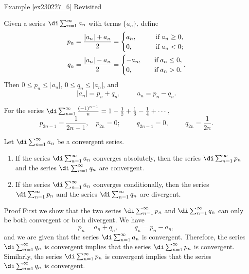 \begin{example}{\linkt Example \ref{ex230227_6} Revisited}
\begin{example}[label=ex230227_13]{}
Given a series $\di\sum_{n=1}^{\infty}a_n$ with terms $\{a_n\}$, define 
\begin{align*}
p_n&=\frac{|a_n|+a_n}{2}=\begin{cases}a_n,\hspace{0.7cm} &\text{if}\;a_n\geq 0,\\0,\quad &\text{if}\;a_n<0;\end{cases}\\q_n&=\frac{|a_n|-a_n}{2}=\begin{cases}-a_n,\quad &\text{if}\;a_n\leq 0,\\0,\quad &\text{if}\;a_n>0.\end{cases}.\end{align*}
Then $0\leq p_n\leq |a_n|$, $0\leq q_n\leq |a_n|$, and
\[|a_n|=p_n+q_n,\hspace{1cm}a_n=p_n-q_n.\]

\begin{example}[label=230228_4]{}
For the series $\di\sum_{n=1}^{\infty}\frac{(-1)^{n-1}}{n}=1-\frac{1}{2}+\frac{1}{3}-\frac{1}{4}+\cdots$,
\[p_{2n-1}=\frac{1}{2n-1},\quad p_{2n}=0;\hspace{1cm}q_{2n-1}=0,\hspace{1cm}q_{2n}=\frac{1}{2n}.\]
\end{example}

\begin{theorem}[label=230228_10]{}Let $\di\sum_{n=1}^{\infty}a_n$ be a convergent series.
\begin{enumerate}[1.]
\item 
If the series $\di\sum_{n=1}^{\infty}a_n$ converges absolutely, then the series $\di\sum_{n=1}^{\infty}p_n$ and the series $\di\sum_{n=1}^{\infty}q_n$ are convergent.
\item 
If the series $\di\sum_{n=1}^{\infty}a_n$ converges conditionally, then the series $\di\sum_{n=1}^{\infty}p_n$ and the series $\di\sum_{n=1}^{\infty}q_n$ are divergent.
 
\end{enumerate}
\end{theorem}
\begin{myproof}{Proof}
First we show that  the two series $\di\sum_{n=1}^{\infty}p_n$ and $\di\sum_{n=1}^{\infty}q_n$ can only be both convergent or both divergent.
We have
\[p_n=a_n+q_n,\hspace{1cm} q_n=p_n-a_n,\]
and we are given that the series $\di\sum_{n=1}^{\infty}a_n$ is convergent. Therefore, the series $\di\sum_{n=1}^{\infty}q_n$ is convergent implies that the series $\di\sum_{n=1}^{\infty}p_n$ is convergent. 
Similarly, the series $\di\sum_{n=1}^{\infty}p_n$ is convergent implies that the series $\di\sum_{n=1}^{\infty}q_n$ is convergent.


\end{myproof}
\end{example}
\end{example}
